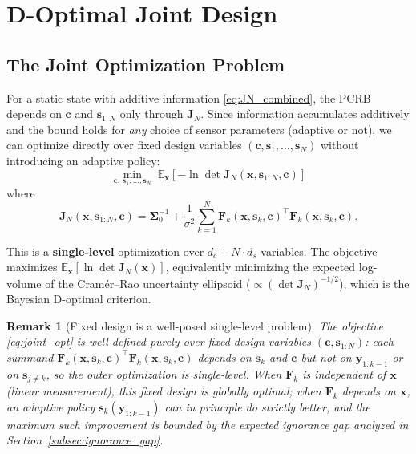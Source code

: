 \documentclass[11pt,a4paper]{article}
\newcommand{\E}{\mathbb{E}}
\newtheorem{remark}{Remark}
\begin{document}
\section{D-Optimal Joint Design}
\label{sec:dopt}

\subsection{The Joint Optimization Problem}

For a static state with additive information \eqref{eq:JN_combined}, the PCRB depends on $\bm{c}$ and $\bm{s}_{1:N}$ only through $\bm{J}_N$.  Since information accumulates additively and the bound holds for \emph{any} choice of sensor parameters (adaptive or not), we can optimize directly over fixed design variables $(\bm{c}, \bm{s}_1, \ldots, \bm{s}_N)$ without introducing an adaptive policy:
\begin{equation}
  \boxed{\min_{\bm{c},\, \bm{s}_1, \ldots, \bm{s}_N} \;\E_{\bm{x}}\!\left[-\ln\det\bm{J}_N(\bm{x}, \bm{s}_{1:N}, \bm{c})\right]}
  \label{eq:joint_opt}
\end{equation}
where
\begin{equation}
  \bm{J}_N(\bm{x}, \bm{s}_{1:N}, \bm{c}) = \bm{\Sigma}_0^{-1} + \frac{1}{\sigma^2}\sum_{k=1}^{N} \bm{F}_k(\bm{x}, \bm{s}_k, \bm{c})^\top \bm{F}_k(\bm{x}, \bm{s}_k, \bm{c}).
  \label{eq:JN_joint}
\end{equation}

This is a \textbf{single-level} optimization over $d_c + N \cdot d_s$ variables.  The objective maximizes $\E_{\bm{x}}[\ln\det\bm{J}_N(\bm{x})]$, equivalently minimizing the expected log-volume of the Cram\'er--Rao uncertainty ellipsoid ($\propto (\det\bm{J}_N)^{-1/2}$), which is the Bayesian D-optimal criterion.

\begin{remark}[Fixed design is a well-posed single-level problem]
The objective \eqref{eq:joint_opt} is well-defined purely over fixed design variables $(\bm{c}, \bm{s}_{1:N})$: each summand $\bm{F}_k(\bm{x}, \bm{s}_k, \bm{c})^\top\bm{F}_k(\bm{x}, \bm{s}_k, \bm{c})$ depends on $\bm{s}_k$ and $\bm{c}$ but not on $\bm{y}_{1:k-1}$ or on $\bm{s}_{j\neq k}$, so the outer optimization is single-level.  When $\bm{F}_k$ is independent of $\bm{x}$ (linear measurement), this fixed design is globally optimal; when $\bm{F}_k$ depends on $\bm{x}$, an adaptive policy $\bm{s}_k(\bm{y}_{1:k-1})$ can in principle do strictly better, and the maximum such improvement is bounded by the \emph{expected ignorance gap} analyzed in Section~\ref{subsec:ignorance_gap}.
\end{remark}
\end{document}
